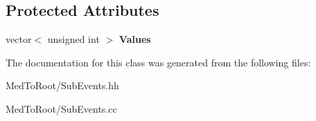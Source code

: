 \subsection*{Protected Attributes}
\begin{DoxyCompactItemize}
\item 
\hypertarget{class_pattern_unit_sub_event_ad8b61039fa93af3c377b739a47c917ab}{vector$<$ unsigned int $>$ {\bfseries Values}}\label{class_pattern_unit_sub_event_ad8b61039fa93af3c377b739a47c917ab}

\end{DoxyCompactItemize}


The documentation for this class was generated from the following files\-:\begin{DoxyCompactItemize}
\item 
Med\-To\-Root/Sub\-Events.\-hh\item 
Med\-To\-Root/Sub\-Events.\-cc\end{DoxyCompactItemize}
